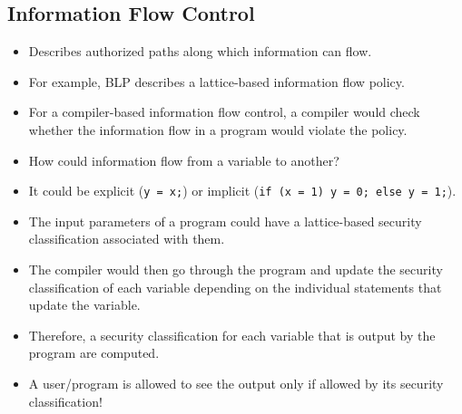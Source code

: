 \documentclass{article}
\begin{document}
\subsection{Information Flow Control}
\begin{itemize}
    \item Describes authorized paths along which information can flow.
    \item For example, BLP describes a lattice-based information flow policy.
    \item For a compiler-based information flow control, a compiler would check whether the information flow in a program would violate the policy.
    \item How could information flow from a variable to another?
    \item It could be explicit (\lstinline{y = x;}) or implicit (\lstinline{if (x = 1) y = 0; else y = 1;}).
    \item The input parameters of a program could have a lattice-based security classification associated with them.
    \item The compiler would then go through the program and update the security classification of each variable depending on the individual statements that update the variable.
    \item Therefore, a security classification for each variable that is output by the program are computed.
    \item A user/program is allowed to see the output only if allowed by its security classification!
\end{itemize}
\end{document}

